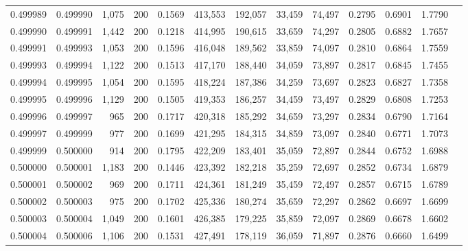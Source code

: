 \begin{tabular}{rrrrrrrrrrrrr}
0.499989 & 0.499990 &  1,075 & 200 &                                     0.1569 & 413,553 & 192,057 &  33,459 &  74,497 & 0.2795 & 0.6901 & 1.7790 \\
0.499990 & 0.499991 &  1,442 & 200 &                                     0.1218 & 414,995 & 190,615 &  33,659 &  74,297 & 0.2805 & 0.6882 & 1.7657 \\
0.499991 & 0.499993 &  1,053 & 200 &                                     0.1596 & 416,048 & 189,562 &  33,859 &  74,097 & 0.2810 & 0.6864 & 1.7559 \\
0.499993 & 0.499994 &  1,122 & 200 &                                     0.1513 & 417,170 & 188,440 &  34,059 &  73,897 & 0.2817 & 0.6845 & 1.7455 \\
0.499994 & 0.499995 &  1,054 & 200 &                                     0.1595 & 418,224 & 187,386 &  34,259 &  73,697 & 0.2823 & 0.6827 & 1.7358 \\
0.499995 & 0.499996 &  1,129 & 200 &                                     0.1505 & 419,353 & 186,257 &  34,459 &  73,497 & 0.2829 & 0.6808 & 1.7253 \\
0.499996 & 0.499997 &    965 & 200 &                                     0.1717 & 420,318 & 185,292 &  34,659 &  73,297 & 0.2834 & 0.6790 & 1.7164 \\
0.499997 & 0.499999 &    977 & 200 &                                     0.1699 & 421,295 & 184,315 &  34,859 &  73,097 & 0.2840 & 0.6771 & 1.7073 \\
0.499999 & 0.500000 &    914 & 200 &                                     0.1795 & 422,209 & 183,401 &  35,059 &  72,897 & 0.2844 & 0.6752 & 1.6988 \\
0.500000 & 0.500001 &  1,183 & 200 &                                     0.1446 & 423,392 & 182,218 &  35,259 &  72,697 & 0.2852 & 0.6734 & 1.6879 \\
0.500001 & 0.500002 &    969 & 200 &                                     0.1711 & 424,361 & 181,249 &  35,459 &  72,497 & 0.2857 & 0.6715 & 1.6789 \\
0.500002 & 0.500003 &    975 & 200 &                                     0.1702 & 425,336 & 180,274 &  35,659 &  72,297 & 0.2862 & 0.6697 & 1.6699 \\
0.500003 & 0.500004 &  1,049 & 200 &                                     0.1601 & 426,385 & 179,225 &  35,859 &  72,097 & 0.2869 & 0.6678 & 1.6602 \\
0.500004 & 0.500006 &  1,106 & 200 &                                     0.1531 & 427,491 & 178,119 &  36,059 &  71,897 & 0.2876 & 0.6660 & 1.6499 \\

\end{tabular}
